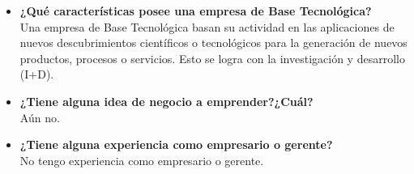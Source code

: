 \documentclass[a4paper,12pt]{article}
\begin{document}
\begin{itemize}
 \item \textbf{¿Qué características posee una empresa de Base Tecnológica?} \\
 Una empresa de Base Tecnológica basan su actividad en las aplicaciones de nuevos descubrimientos científicos o tecnológicos
 para la generación de nuevos productos, procesos o servicios. Esto se logra con la investigación y desarrollo (I+D).
 
 \item \textbf{¿Tiene alguna idea de negocio a emprender?¿Cuál?} \\
 Aún no.
 
 \item \textbf{¿Tiene alguna experiencia como empresario o gerente?} \\
 No tengo experiencia como empresario o gerente.
 
\end{itemize}
\end{document}
